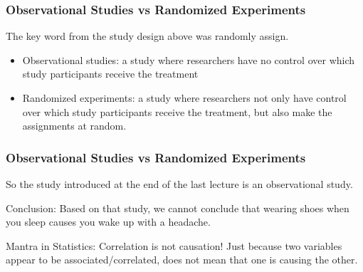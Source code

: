 \documentclass[handout]{beamer}
\newcommand{\blue}[1]{\textcolor{blue2}{#1}}
\begin{document}
\begin{frame}
\frametitle{Observational Studies vs Randomized Experiments}
The key word from the study design above was \blue{randomly assign}.

\begin{itemize}
  \pause\item \blue{Observational studies}: a study where researchers have \blue{no control} over which study participants receive the treatment
  \pause\item \blue{Randomized experiments}: a study where researchers not only have control over which study participants receive the treatment, but also make the assignments \blue{at random}.
\end{itemize}

\end{frame}


\begin{frame}
\frametitle{Observational Studies vs Randomized Experiments}
So the study introduced at the end of the last lecture is an \blue{observational study}.

\vspace{0.5cm}

\pause\blue{Conclusion}:  Based on that study, we cannot conclude that wearing shoes when you sleep \blue{causes} you wake up with a headache.

\vspace{0.5cm}

\pause\blue{Mantra in Statistics}:  \blue{Correlation is not causation!}  Just because two variables appear to be associated/correlated, does not mean that one is \blue{causing the other}.

\end{frame}
\end{document}
